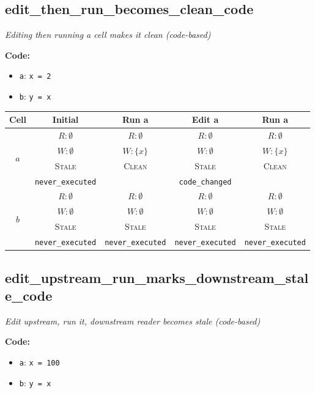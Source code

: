 \documentclass{article}
\begin{document}
\subsection{edit\_then\_run\_becomes\_clean\_code}
\textit{Editing then running a cell makes it clean (code-based)}

\textbf{Code:}
\begin{itemize}
  \item \texttt{a}: \verb|x = 2|
  \item \texttt{b}: \verb|y = x|
\end{itemize}

\begin{center}
\small
\begin{tabular}{|c|c|c|c|c|}
\hline
\textbf{Cell} & \textbf{Initial} & \textbf{Run a} & \textbf{Edit a} & \textbf{Run a} \\
\hline
\multirow{4}{*}{$a$}
  & $R: \emptyset$ & $R: \emptyset$ & $R: \emptyset$ & $R: \emptyset$ \\
  & $W: \emptyset$ & $W: \{x\}$ & $W: \emptyset$ & $W: \{x\}$ \\
  & \textsc{Stale} & \textsc{Clean} & \textsc{Stale} & \textsc{Clean} \\
  & \footnotesize\texttt{never\_executed} &  & \footnotesize\texttt{code\_changed} &  \\
\hline
\multirow{4}{*}{$b$}
  & $R: \emptyset$ & $R: \emptyset$ & $R: \emptyset$ & $R: \emptyset$ \\
  & $W: \emptyset$ & $W: \emptyset$ & $W: \emptyset$ & $W: \emptyset$ \\
  & \textsc{Stale} & \textsc{Stale} & \textsc{Stale} & \textsc{Stale} \\
  & \footnotesize\texttt{never\_executed} & \footnotesize\texttt{never\_executed} & \footnotesize\texttt{never\_executed} & \footnotesize\texttt{never\_executed} \\
\hline
\end{tabular}
\end{center}


\subsection{edit\_upstream\_run\_marks\_downstream\_stale\_code}
\textit{Edit upstream, run it, downstream reader becomes stale (code-based)}

\textbf{Code:}
\begin{itemize}
  \item \texttt{a}: \verb|x = 100|
  \item \texttt{b}: \verb|y = x|
\end{itemize}
\end{document}
